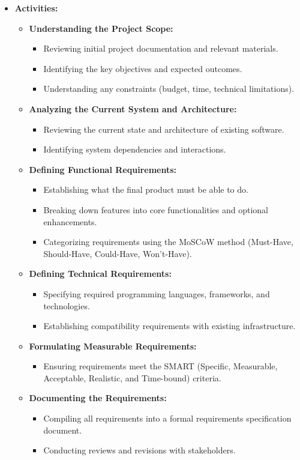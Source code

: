 \documentclass{article}
\begin{document}
\begin{itemize}[leftmargin=*, label={}]
    \item \textbf{Activities:}
    \begin{itemize}
        \item \textbf{Understanding the Project Scope:}
        \begin{itemize}
            \item Reviewing initial project documentation and relevant materials.
            \item Identifying the key objectives and expected outcomes.
            \item Understanding any constraints (budget, time, technical limitations).
        \end{itemize}
        \item \textbf{Analyzing the Current System and Architecture:}
        \begin{itemize}
            \item Reviewing the current state and architecture of existing software.
            \item Identifying system dependencies and interactions.
        \end{itemize}
        \item \textbf{Defining Functional Requirements:}
        \begin{itemize}
            \item Establishing what the final product must be able to do.
            \item Breaking down features into core functionalities and optional enhancements.
            \item Categorizing requirements using the MoSCoW method (Must-Have, Should-Have, Could-Have, Won't-Have).
        \end{itemize}
        \item \textbf{Defining Technical Requirements:}
        \begin{itemize}
            \item Specifying required programming languages, frameworks, and technologies.
            \item Establishing compatibility requirements with existing infrastructure.
        \end{itemize}
        \item \textbf{Formulating Measurable Requirements:}
        \begin{itemize}
            \item Ensuring requirements meet the SMART (Specific, Measurable, Acceptable, Realistic, and Time-bound) criteria.
        \end{itemize}
        \item \textbf{Documenting the Requirements:}
        \begin{itemize}
            \item Compiling all requirements into a formal requirements specification document.
            \item Conducting reviews and revisions with stakeholders.
        \end{itemize}
    \end{itemize}


\end{itemize}
\end{document}
